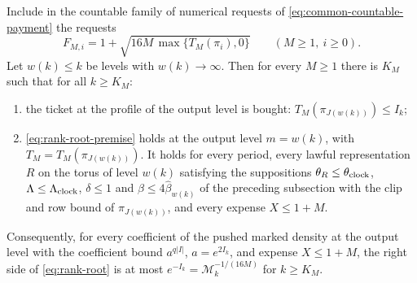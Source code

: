 \begin{proposition}
\label{prop:rank-root-output-ticket}
Include in the countable family of numerical requests of
\eqref{eq:common-countable-payment} the requests
\begin{equation}\label{eq:rank-root-ticket-requests}
 F_{M,i}=1+\sqrt{16M\,\max\{T_M(\pi_i),0\}}\qquad(M\ge1,\ i\ge0).
\end{equation}
Let $w(k)\le k$ be levels with $w(k)\to\infty$. Then for every
$M\ge1$ there is $K_M$ such that for all $k\ge K_M$:
\begin{enumerate}
\item the ticket at the profile of the output level is bought:
 $T_M(\pi_{J(w(k))})\le I_k$;
\item \eqref{eq:rank-root-premise} holds at the output level $m=w(k)$,
 with $T_M=T_M(\pi_{J(w(k))})$. It holds for every period, every
 lawful representation $R$ on the torus of level $w(k)$ satisfying the
 suppositions $\theta_R\le\theta_{\rm clock}$, $\Lambda\le\Lambda_{\rm clock}$,
 $\delta\le1$ and $\beta\le4\widehat\beta_{w(k)}$ of the preceding
 subsection with the clip and row bound of $\pi_{J(w(k))}$, and every
 expense $X\le1+M$.
\end{enumerate}
Consequently, for every coefficient of the pushed marked density at the
output level with the coefficient bound $a^{q|I|}$, $a=e^{2I_k}$, and
expense $X\le1+M$, the right side of \eqref{eq:rank-root} is at most
$e^{-I_k}=\mathcal M_k^{-1/(16M)}$ for $k\ge K_M$.
\end{proposition}
